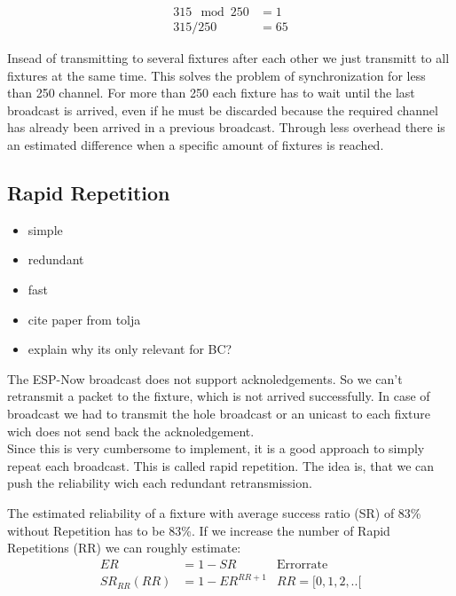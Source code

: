 \documentclass[]{ccs-thesis}
\begin{document}
\begin{align*}
	315 \mod 250 &= 1 \\
	315 / 250 &= 65
\end{align*}

Insead of transmitting to several fixtures after each other we just transmitt to all fixtures at the same time.
This solves the problem of synchronization for less than 250 channel.
For more than 250 each fixture has to wait until the last broadcast is arrived, 
even if he must be discarded because the required channel has already been arrived in a previous broadcast.
Through less overhead there is an estimated difference when a specific amount of fixtures is reached.

\subsection*{Rapid Repetition}
\begin{itemize}
\item simple
\item redundant
\item fast
\item cite paper from tolja
\item explain why its only relevant for BC?
\end{itemize}

The ESP-Now broadcast does not support acknoledgements.
So we can't retransmit a packet to the fixture, which is not arrived successfully.
In case of broadcast we had to transmit the hole broadcast or an unicast to each fixture wich does not send back the acknoledgement.\\

Since this is very cumbersome to implement, it is a good approach to simply repeat each broadcast. 
This is called rapid repetition. 
The idea is, that we can push the reliability wich each redundant retransmission.

The estimated reliability of a fixture with average success ratio (SR) of 83\% without Repetition has to be 83\%.
If we increase the number of Rapid Repetitions (RR) we can roughly estimate:
\begin{align*}
	ER &= 1-SR &\text{Errorrate}\\
	SR_{RR}(RR) &= 1-ER^{RR+1} & RR=[0,1,2,..[
\end{align*}
\end{document}
